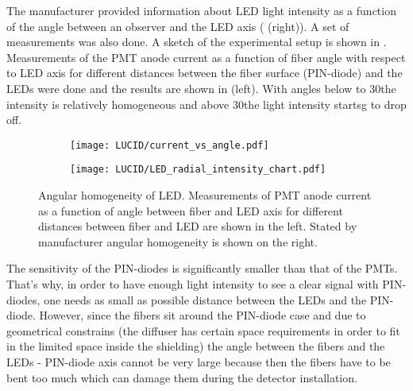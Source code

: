 

The manufacturer provided information about LED light intensity as a function of the angle between an observer and the LED axis 
( (right)).
A set of measurements was also done.
A sketch of the experimental setup is shown in .
Measurements of the PMT anode current as a function of fiber angle with respect to LED axis for different distances between 
the fiber surface (PIN-diode) and the LEDs were done and the results are shown in  (left).
With angles below to 30\degree the intensity is relatively homogeneous and above 30\degree the light intensity startsg to drop off.

\begin{figure}
\begin{subfigure}{.46\textwidth}
  \centering
  \texttt{[image: LUCID/current\_vs\_angle.pdf]}
\end{subfigure}
\begin{subfigure}{.51\textwidth}
  \centering
  \texttt{[image: LUCID/LED\_radial\_intensity\_chart.pdf]}
\end{subfigure}

\caption{Angular homogeneity of LED. Measurements of PMT anode current as a function of angle between fiber and LED axis for different distances between fiber and LED are shown in the left.
	 Stated by manufacturer angular homogeneity is shown on the right.}
\label{fig:AngularDistributionOfLED}
\end{figure}

The sensitivity of the PIN-diodes is significantly smaller than that of the PMTs.
That's why, in order to have enough light intensity to see a clear signal with PIN-diodes, one needs as small as possible
distance between the LEDs and the PIN-diode. However, since the fibers sit around the PIN-diode case and due to geometrical constrains 
(the diffuser has certain space requirements in order to fit in the limited space inside the shielding) 
the angle between the fibers and the LEDs - PIN-diode axis cannot be very large because then
the fibers have to be bent too much which can damage them during the detector installation.

